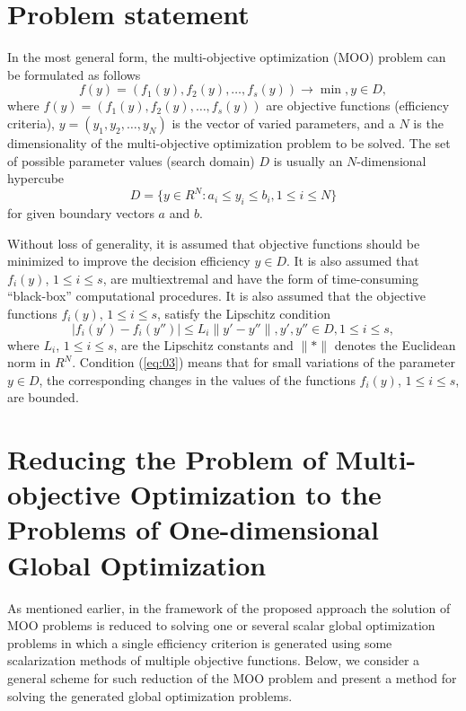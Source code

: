 \documentclass[runningheads]{llncs}
\begin{document}
\section{Problem statement} \label{sec:02}

In the most general form, the multi-objective optimization (MOO) problem can be formulated as follows
\begin{equation}
\label{eq:01}
f(y) = (f_1(y), f_2(y), \dots, f_s(y)) \to \min,  y\in D,
\end{equation}
where $f(y) = (f_1(y), f_2(y), \dots, f_s(y))$ are objective functions (efficiency criteria), $y = (y_1, y_2, \dots , y_N)$ is the vector of varied parameters, and a $N$ is the dimensionality of the multi-objective optimization problem to be solved. The set of possible parameter values (search domain) $D$ is usually an $N$-dimensional hypercube
\begin{equation}
\label{eq:02}
D  = \{ y\in R^N: a_i \leq y_i \leq b_i, 1 \leq i \leq N \}
\end{equation}
for given boundary vectors $a$ and $b$.

Without loss of generality, it is assumed that objective functions should be minimized to improve the decision efficiency $y \in D$. It is also assumed that $f_i(y)$, $1 \leq i \leq s$, are multiextremal and have the form of time-consuming ``black-box'' computational procedures. It is also assumed that the objective functions $f_i(y)$, $1 \leq i \leq s$, satisfy the Lipschitz condition 
\begin{equation}
\label{eq:03}
|f_i(y') - f_i(y'')| \leq L_i\|y' - y''\|, y', y'' \in D, 1 \leq i \leq s,
\end{equation}
where $L_i$, $1 \leq i \leq s$, are the Lipschitz constants and $\|*\|$ denotes the Euclidean norm in $R^N$.  Condition (\ref{eq:03}) means that for small variations of the parameter $y \in D$, the corresponding changes in the values of the functions $f_i(y)$, $1 \leq i \leq s$, are bounded. 

\section{Reducing the Problem of Multi-objective Optimization to the Problems of One-dimensional Global Optimization} \label{sec:03}

As mentioned earlier, in the framework of the proposed approach the solution of MOO problems is reduced to solving one or several scalar global optimization problems in which a single efficiency criterion is generated using some scalarization methods of multiple objective functions. Below, we consider a general scheme for such reduction of the MOO problem and present a method for solving the generated global optimization problems.
\end{document}

